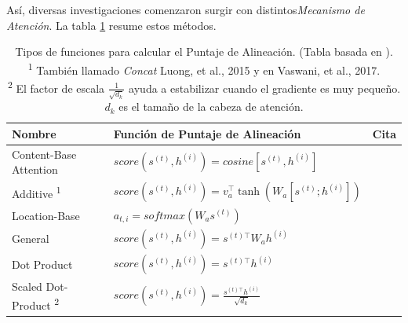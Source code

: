 Así, diversas investigaciones comenzaron surgir con distintos\textit{Mecanismo de Atención}. La tabla
\ref{Tab:att} resume estos métodos.

\begin{table}[]
\begin{center}
\begin{tabular}{@{}lll@{}}
\toprule
\textbf{Nombre} & \textbf{Función de Puntaje de Alineación} & \textbf{Cita} \\ \midrule
Content-Base Attention & $score(s^{(t)}, h^{(i)}) = cosine[s^{(t)}, h^{(i)}]$ & \cite[Graves 2014]{DBLP:journals/corr/GravesWD14} \\
Additive \textsuperscript{1} & $score(s^{(t)}, h^{(i)}) = v^\top_a \tanh(W_a[s^{(t)};h^{(i)}])$ &  \cite[Bahdanau 2015]{bahdanau2016neural}  \\
Location-Base & $a_{t,i} = softmax(W_a s^{(t)})$ & \cite[Luong 2015]{DBLP:journals/corr/LuongPM15} \\
General & $score(s^{(t)}, h^{(i)}) = s^{(t)\top} W_a h^{(i)}$ &  \cite[Luong 2015]{DBLP:journals/corr/LuongPM15} \\
Dot Product & $score(s^{(t)}, h^{(i)}) = s^{(t)\top} h^{(i)}$ &  \cite[Luong 2015]{DBLP:journals/corr/LuongPM15} \\
Scaled Dot-Product \textsuperscript{2} & $score(s^{(t)}, h^{(i)}) = \frac{s^{(t)\top} h^{(i)}}{\sqrt{d_k}}$ &  \cite[Vaswani 2017]{DBLP:journals/corr/VaswaniSPUJGKP17} \\ \bottomrule
\end{tabular}
\end{center}
\caption{Tipos de funciones para calcular el Puntaje de Alineación. (Tabla basada en \cite{weng2018attention}). \\
\textsuperscript{1} También llamado \textit{Concat} Luong, et al., 2015 y
 en Vaswani, et al., 2017.\\
\textsuperscript{2} El factor de escala $\frac{1}{\sqrt{d_k}}$ ayuda a estabilizar cuando el
gradiente es muy pequeño. $d_k$ es el tamaño de la cabeza de atención.
\label{Tab:att}}
\end{table}
